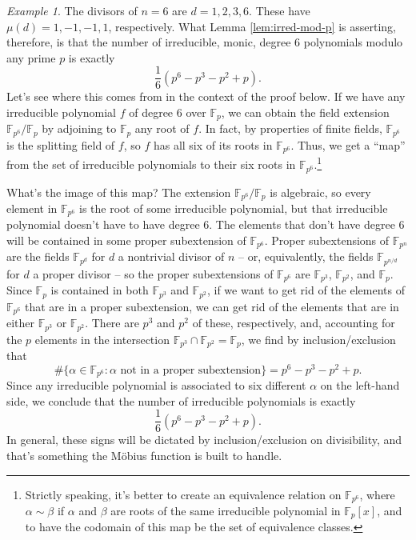 \documentclass[12pt]{amsart}
\theoremstyle{definition} \newtheorem*{notation}{Notation}
\theoremstyle{remark} \newtheorem*{remark}{Remark}
\theoremstyle{remark} \newtheorem*{example}{Example}
\theoremstyle{definition} \newtheorem*{definition}{Definition}
\numberwithin{equation}{section}
\numberwithin{theorem}{section}
\begin{document}
	\begin{example}
		The divisors of $n=6$ are $d=1,2,3,6$.  These have $\mu(d)=1,-1,-1,1$, respectively.  What Lemma \ref{lem:irred-mod-p} is asserting, therefore, is that the number of irreducible, monic, degree $6$ polynomials modulo any prime $p$ is exactly
			\[
				\frac{1}{6}\left(p^6 - p^3 - p^2 + p\right).
			\]
		Let's see where this comes from in the context of the proof below.  
		If we have any irreducible polynomial $f$ of degree $6$ over $\mathbb{F}_p$, we can obtain the field extension $\mathbb{F}_{p^6}/\mathbb{F}_p$ by adjoining to $\mathbb{F}_p$ any root of $f$.  In fact, by properties of finite fields, $\mathbb{F}_{p^6}$ is the splitting field of $f$, so $f$ has all six of its roots in $\mathbb{F}_{p^6}$.  Thus, we get a ``map'' from the set of irreducible polynomials to their six roots in $\mathbb{F}_{p^6}$.\footnote{Strictly speaking, it's better to create an equivalence relation on $\mathbb{F}_{p^6}$, where $\alpha \sim \beta$ if $\alpha$ and $\beta$ are roots of the same irreducible polynomial in $\mathbb{F}_p[x]$, and to have the codomain of this map be the set of equivalence classes.}
		
		What's the image of this map?  The extension $\mathbb{F}_{p^6}/\mathbb{F}_p$ is algebraic, so every element in $\mathbb{F}_{p^6}$ is the root of some irreducible polynomial, but that irreducible polynomial doesn't have to have degree $6$.  The elements that don't have degree $6$ will be contained in some proper subextension of $\mathbb{F}_{p^6}$.  Proper subextensions of $\mathbb{F}_{p^n}$ are the fields $\mathbb{F}_{p^d}$ for $d$ a nontrivial divisor of $n$ -- or, equivalently, the fields $\mathbb{F}_{p^{n/d}}$ for $d$ a proper divisor -- so the proper subextensions of $\mathbb{F}_{p^6}$ are $\mathbb{F}_{p^3}$, $\mathbb{F}_{p^2}$, and $\mathbb{F}_p$.  Since $\mathbb{F}_p$ is contained in both $\mathbb{F}_{p^3}$ and $\mathbb{F}_{p^2}$, if we want to get rid of the elements of $\mathbb{F}_{p^6}$ that are in a proper subextension, we can get rid of the elements that are in either $\mathbb{F}_{p^3}$ or $\mathbb{F}_{p^2}$.  There are $p^3$ and $p^2$ of these, respectively, and, accounting for the $p$ elements in the intersection $\mathbb{F}_{p^3} \cap \mathbb{F}_{p^2} = \mathbb{F}_p$, we find by inclusion/exclusion that
			\[
				\#\{\alpha \in \mathbb{F}_{p^6} : \alpha \text{ not in a proper subextension}\}
					= p^6 - p^3 - p^2 + p.
			\]
		Since any irreducible polynomial is associated to six different $\alpha$ on the left-hand side, we conclude that the number of irreducible polynomials is exactly
			\[
				\frac{1}{6} (p^6 -p^3 - p^2+p).
			\]	
		In general, these signs will be dictated by inclusion/exclusion on divisibility, and that's something the M\"obius function is built to handle.
	\end{example}
	
\end{document}
